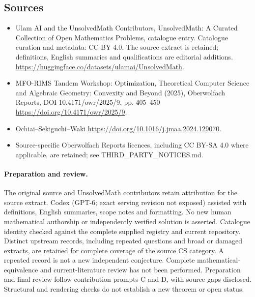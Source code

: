 \documentclass[11pt]{article}
\begin{document}
\subsection{Sources}
\begin{itemize}
\item[\hypertarget{source:statement:1}{S1}] Ulam AI and the UnsolvedMath Contributors, UnsolvedMath: A Curated Collection of Open Mathematics Problems, catalogue entry. Catalogue curation and metadata: CC BY 4.0. The source extract is retained; definitions, English summaries and qualifications are editorial additions.
\url{https://huggingface.co/datasets/ulamai/UnsolvedMath}.
\item[\hypertarget{source:statement:2}{S2}] MFO-RIMS Tandem Workshop: Optimization, Theoretical Computer Science and Algebraic Geometry: Convexity and Beyond (2025), Oberwolfach Reports, DOI 10.4171/owr/2025/9, pp. 405--450
\url{https://doi.org/10.4171/owr/2025/9}.
\item[\hypertarget{source:statement:3}{S3}] Ochiai--Sekiguchi--Waki
\url{https://doi.org/10.1016/j.jmaa.2024.129070}.
\item Source-specific Oberwolfach Reports licences, including CC BY-SA 4.0 where applicable, are retained; see THIRD\_PARTY\_NOTICES.md.
\end{itemize}
\paragraph{Preparation and review.}
The original source and UnsolvedMath contributors retain attribution for the source extract. Codex (GPT-6; exact serving revision not exposed) assisted with definitions, English summaries, scope notes and formatting. No new human mathematical authorship or independently verified solution is asserted. Catalogue identity checked against the complete supplied registry and current repository. Distinct upstream records, including repeated questions and broad or damaged extracts, are retained for complete coverage of the source CS category. A repeated record is not a new independent conjecture. Complete mathematical-equivalence and current-literature review has not been performed. Preparation and final review follow contribution prompts C and D, with source gaps disclosed. Structural and rendering checks do not establish a new theorem or open status.
\label{end:statement}
\end{document}
